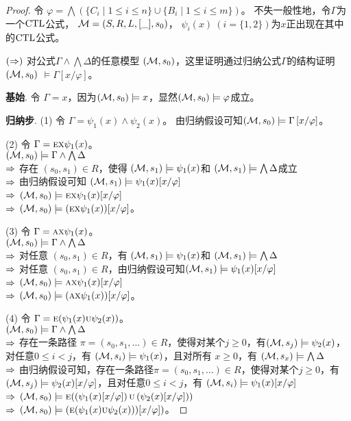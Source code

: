 \begin{proof}
	令 $\varphi = \bigwedge\left(\{C_i\mid 1\le i\le n\}\cup\{B_i\mid 1\le i\le m\}\right)$。
	不失一般性地，令$\Gamma$为一个$\textrm{CTL}$公式， ${\cal M}=(S,R,L,[\_],s_0)$， $\psi_i(x)~(i=\{1,2\})$为$x$正出现在其中的$\textrm{CTL}$公式。
	
	$(\Rightarrow)$ 对公式$\Gamma \wedge \bigwedge \Delta$的任意模型 $({\cal M}, s_0)$，这里证明通过归纳公式$\Gamma$的结构证明 $({\cal M}, s_0)$ $\models\Gamma\left[x/\varphi \right]$。
	
	\textbf{基始}. 令 $\Gamma = x$，因为$({\cal M}, s_0)\models x$，显然$({\cal M}, s_0)\models \varphi$成立。
	
	\textbf{归纳步}. (1) 令 $\Gamma= \psi_1(x) \wedge \psi_2(x)$。
	由归纳假设可知$({\cal M}, s_0)\models \Gamma\left[x/\varphi \right]$。
	
	(2) 令 $\Gamma = \textsc{e}\textsc{x} \psi_1(x)$。 \\
	$({\cal M},s_0)\models \Gamma \wedge \bigwedge \Delta$\\
	$\Rightarrow$ 存在 $(s_0, s_1)\in R$，使得 $({\cal M},s_1) \models \psi_1(x)$和 $({\cal M},s_1) \models \bigwedge \Delta$成立\\
	$\Rightarrow$ 由归纳假设可知 $({\cal M},s_1) \models \psi_1(x)[x/\varphi]$\\
	$\Rightarrow$ $({\cal M},s_0)\models \textsc{e}\textsc{x} \psi_1(x)[x/\varphi]$\\
	$\Rightarrow$ $({\cal M},s_0)\models (\textsc{e}\textsc{x} \psi_1(x))[x/\varphi]$。
	
	(3) 令 $\Gamma = \textsc{a}\textsc{x} \psi_1(x)$。 \\
	$({\cal M},s_0)\models \Gamma \wedge \bigwedge \Delta$\\
	$\Rightarrow$ 对任意 $(s_0, s_1)\in R$，有 $({\cal M},s_1) \models \psi_1(x)$和 $({\cal M},s_1) \models \bigwedge \Delta$\\
	$\Rightarrow$  对任意 $(s_0, s_1)\in R$，由归纳假设可知$({\cal M},s_1) \models \psi_1(x)[x/\varphi]$\\
	$\Rightarrow$ $({\cal M},s_0)\models \textsc{a}\textsc{x} \psi_1(x)[x/\varphi]$\\
	$\Rightarrow$ $({\cal M},s_0)\models (\textsc{a}\textsc{x} \psi_1(x))[x/\varphi]$。
	
	(4) 令 $\Gamma = \textsc{e}(\psi_1(x) \textsc{u} \psi_2(x))$。 \\
	$({\cal M},s_0)\models \Gamma \wedge \bigwedge \Delta$\\
	$\Rightarrow$ 存在一条路径 $\pi=(s_0, s_1, \dots)\in R$，使得对某个$j \geq 0$，有$({\cal M},s_j) \models \psi_2(x)$，对任意$0\leq i < j$，有 $({\cal M},s_i) \models \psi_1(x)$，且对所有 $x \geq 0$，有 $({\cal M},s_x) \models \bigwedge \Delta$\\
	$\Rightarrow$ 由归纳假设可知，存在一条路径$\pi=(s_0, s_1, \dots)\in R$，使得对某个$j \geq 0$，有$({\cal M},s_j) \models \psi_2(x)[x/\varphi]$，且对任意$0\leq i < j$，有 $({\cal M},s_i) \models \psi_1(x)[x/\varphi]$\\
	$\Rightarrow$ $({\cal M},s_0)\models \textsc{e}(\left(\psi_1(x)[x/\varphi]\right) \textsc{u} \left(\psi_2(x)[x/\varphi]\right))$\\
	$\Rightarrow$ $({\cal M},s_0)\models \left(\textsc{e}(\psi_1(x) \textsc{u} \psi_2(x)))[x/\varphi]\right)$。
	

\end{proof}
